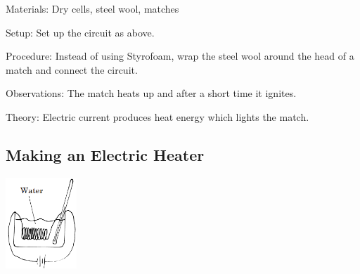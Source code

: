 \begin{multicols}{2}
\begin{description*}
\item[Materials:]{Dry cells, steel wool, matches}
\item[Setup:]{Set up the circuit as above.}
\item[Procedure:]{Instead of using Styrofoam, wrap the steel wool around the head of a match and connect the circuit.}
\item[Observations:]{The match heats up and after a short time it ignites.}
\item[Theory:]{Electric current produces heat energy which lights the match.}
\end{description*}

\columnbreak

\subsection{Making an Electric Heater} 

\begin{center}
\includegraphics[width=0.2\textwidth]{./img/electric-heater.png}
\end{center}


\end{multicols}
